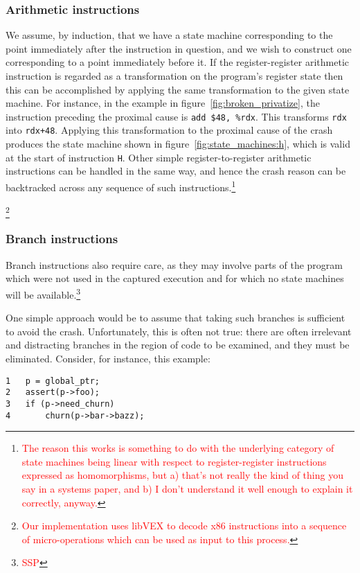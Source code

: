 \documentclass[10pt,twocolumn,preprint,natbib,authoryear]{sigplanconf}
\newcommand{\editorial}[1]{\textcolor{red}{\footnote{\textcolor{red}{#1}}}}
\begin{document}
\subsubsection{Arithmetic instructions}

We assume, by induction, that we have a state machine corresponding to
the point immediately after the instruction in question, and we wish
to construct one corresponding to a point immediately before it.  If
the register-register arithmetic instruction is regarded as a
transformation on the program's register state then this can be
accomplished by applying the same transformation to the given state
machine.  For instance, in the example in
figure~\ref{fig:broken_privatize}, the instruction preceding the
proximal cause is \verb|add $48, %rdx|.  This transforms \verb|rdx|
into \verb|rdx+48|.  Applying this transformation to the proximal
cause of the crash produces the state machine shown in
figure~\ref{fig:state_machines:h}, which is valid at the start of
instruction \verb|H|.  Other simple register-to-register arithmetic
instructions can be handled in the same way, and hence the crash
reason can be backtracked across any sequence of such
instructions.\editorial{The reason this works is something to do with
  the underlying category of state machines being linear with respect
  to register-register instructions expressed as homomorphisms, but a)
  that's not really the kind of thing you say in a systems paper, and
  b) I don't understand it well enough to explain it correctly,
  anyway.}

\editorial{Our implementation uses libVEX to decode x86 instructions
  into a sequence of micro-operations which can be used as input to
  this process.} 

\subsubsection{Branch instructions}
\label{sect:branch_instrs}
Branch instructions also require care, as they may involve parts of
the program which were not used in the captured execution and for
which no state machines will be available.\editorial{SSP}

One simple approach would be to assume that taking such branches is
sufficient to avoid the crash.  Unfortunately, this is often not true:
there are often irrelevant and distracting branches in the region of
code to be examined, and they must be eliminated.  Consider, for
instance, this example:

\begin{verbatim}
1   p = global_ptr;
2   assert(p->foo);
3   if (p->need_churn)
4       churn(p->bar->bazz);
\end{verbatim}
\end{document}
